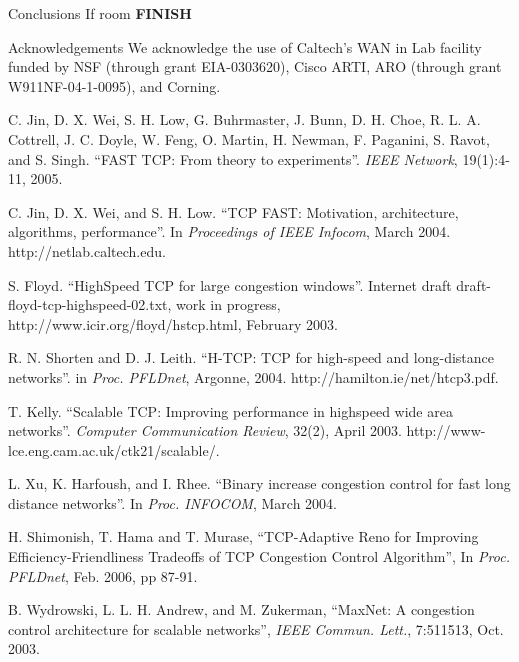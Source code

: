 \documentclass{IEEEtran}
\begin{document}
\begin{section}{Conclusions}
If room {\bf FINISH}
\end{section}

\begin{section}{Acknowledgements}
We acknowledge the use of Caltech's WAN in Lab facility funded by NSF (through
grant EIA-0303620), Cisco ARTI, ARO (through grant W911NF-04-1-0095), and
Corning.
\end{section}


\begin{thebibliography}{10}

 C. Jin, D. X. Wei, S. H. Low, G. Buhrmaster, J. Bunn, D. H.
Choe, R. L. A. Cottrell, J. C. Doyle, W. Feng, O. Martin, H. Newman, F.
Paganini, S. Ravot, and S. Singh. ``FAST TCP: From theory to experiments''.
{\it IEEE Network}, 19(1):4-11, 2005.

 C. Jin, D. X. Wei, and S. H. Low. ``TCP FAST:
Motivation, architecture, algorithms, performance''. In {\it Proceedings of
IEEE Infocom}, March 2004. http://netlab.caltech.edu.

 S. Floyd. ``HighSpeed TCP for large congestion windows''. Internet draft draft-floyd-tcp-highspeed-02.txt, work in progress, http://www.icir.org/floyd/hstcp.html, February 2003.

 R. N. Shorten and D. J. Leith. ``H-TCP: TCP for high-speed and
long-distance networks''. in {\it Proc. PFLDnet}, Argonne, 2004. http://hamilton.ie/net/htcp3.pdf.

 T. Kelly. ``Scalable TCP: Improving performance in highspeed
wide area networks''. {\it Computer Communication Review}, 32(2), April 2003.	
http://www-lce.eng.cam.ac.uk/ctk21/scalable/.

 L. Xu, K. Harfoush, and I. Rhee. ``Binary increase congestion
control for fast long distance networks''. In {\it Proc. INFOCOM}, March 2004.

 H. Shimonish, T.  Hama and T. Murase, ``TCP-Adaptive Reno for
Improving Efficiency-Friendliness Tradeoffs of TCP Congestion Control
Algorithm'', In {\it Proc. PFLDnet}, Feb. 2006, pp 87-91.

 B. Wydrowski, L. L. H. Andrew, and M. Zukerman, ``MaxNet: A
congestion control architecture for scalable networks'', {\it IEEE Commun. Lett.}, 7:511513, Oct. 2003.


\end{thebibliography}
\end{document}

